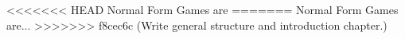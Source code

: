 
<<<<<<< HEAD
Normal Form Games are
=======
Normal Form Games are...
>>>>>>> f8cec6c (Write general structure and introduction chapter.)
